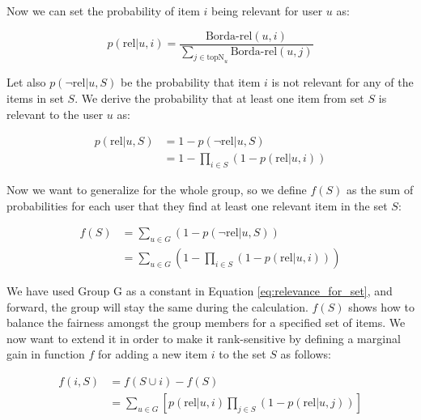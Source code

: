 Now we can set the probability of item $i$ being relevant for user $u$ as:

\begin{equation}
    p(\textrm{rel}|u, i) = \frac{\textrm{Borda-rel}(u, i)}{\sum_{j \in \textrm{topN}_u}{\textrm{Borda-rel}(u, j)}}
\end{equation}

Let also $p(\neg\textrm{rel}|u, S)$ be the probability that item $i$ is not relevant for any of the items in set $S$. We derive the probability that at least one item from set $S$ is relevant to the user $u$ as:

\begin{equation} \label{eq:atleast_one_relevant}
\begin{aligned}
    p(\textrm{rel}|u, S) &= 1 - p(\neg\textrm{rel}|u, S) \\
    & = 1 - \prod_{i \in S}{(1 - p(\textrm{rel}|u, i))}
\end{aligned}
\end{equation}

Now we want to generalize for the whole group, so we define $f(S)$ as the sum of probabilities for each user that they find at least one relevant item in the set $S$:

\begin{equation} \label{eq:relevance_for_set}
\begin{aligned}
    f(S) &= \sum_{u \in G}{\left(1 - p(\neg\textrm{rel}|u, S)\right)} \\
    & = \sum_{u \in G}{\left(1 - \prod_{i \in S}{(1 - p(\textrm{rel}|u, i))}\right)}
\end{aligned}
\end{equation}

We have used Group G as a constant in Equation \ref{eq:relevance_for_set}, and forward, the group will stay the same during the calculation. $f(S)$ shows how to balance the fairness amongst the group members for a specified set of items. We now want to extend it in order to make it rank-sensitive by defining a marginal gain in function $f$ for adding a new item $i$ to the set $S$ as follows:

\begin{equation} \label{eq:relevance_for_set_add}
\begin{aligned}
    f(i, S) &= f(S \cup {i}) - f(S) \\
    & = \sum_{u \in G}{\left[p(\textrm{rel}|u, i) \prod_{j \in S}{(1 - p(\textrm{rel}|u, j))}\right]}
\end{aligned}
\end{equation}

